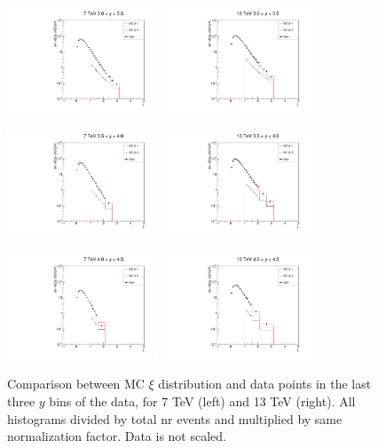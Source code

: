 \documentclass{article}
\begin{document}
\begin{figure}[h!]
\centering
\includegraphics[width = 0.4\textwidth]{xi_7_y5.pdf}
\includegraphics[width = 0.4\textwidth]{xi_13_y5.pdf}

\includegraphics[width = 0.4\textwidth]{xi_7_y6.pdf}
\includegraphics[width = 0.4\textwidth]{xi_13_y6.pdf}

\includegraphics[width = 0.4\textwidth]{xi_7_y7.pdf}
\includegraphics[width = 0.4\textwidth]{xi_13_y7.pdf}
\caption{Comparison between MC $\xi$ distribution and data points in the last three $y$ bins of the data, for 7 TeV (left) and 13 TeV (right). All histograms divided by total nr events and multiplied by same normalization factor. Data is not scaled.}\label{f:xi_comp_3}
\end{figure}
\end{document}
